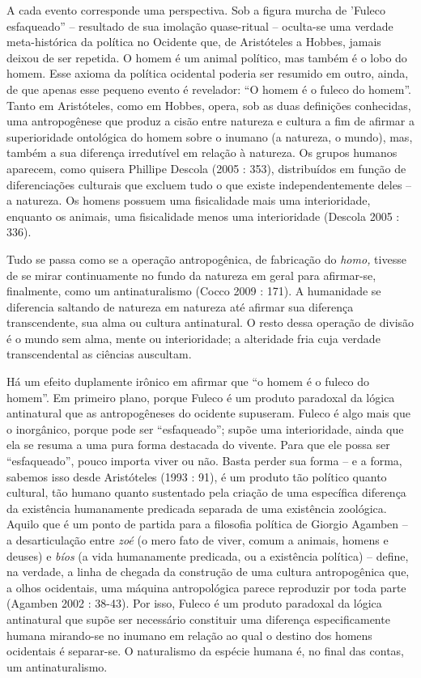 A cada evento corresponde uma perspectiva. Sob a figura murcha de
'Fuleco esfaqueado'' -- resultado de sua imolação quase-ritual --
oculta-se uma verdade meta-histórica da política no Ocidente que, de
Aristóteles a Hobbes, jamais deixou de ser repetida. O homem é um animal
político, mas também é o lobo do homem. Esse axioma da política
ocidental poderia ser resumido em outro, ainda, de que apenas esse
pequeno evento é revelador: ``O homem é o fuleco do homem''. Tanto em
Aristóteles, como em Hobbes, opera, sob as duas definições conhecidas,
uma antropogênese que produz a cisão entre natureza e cultura a fim de
afirmar a superioridade ontológica do homem sobre o inumano (a natureza,
o mundo), mas, também a sua diferença irredutível em relação à natureza.
Os grupos humanos aparecem, como quisera Phillipe Descola (2005 : 353),
distribuídos em função de diferenciações culturais que excluem tudo o
que existe independentemente deles -- a natureza. Os homens possuem uma
fisicalidade mais uma interioridade, enquanto os animais, uma
fisicalidade menos uma interioridade (Descola 2005 : 336).

Tudo se passa como se a operação antropogênica, de fabricação do
\emph{homo, }tivesse de se mirar continuamente no fundo da natureza em
geral para afirmar-se, finalmente, como um antinaturalismo (Cocco 2009 :
171). A humanidade se diferencia saltando de natureza em natureza até
afirmar sua diferença transcendente, sua alma ou cultura antinatural. O
resto dessa operação de divisão é o mundo sem alma, mente ou
interioridade; a alteridade fria cuja verdade transcendental as ciências
auscultam.

Há um efeito duplamente irônico em afirmar que ``o homem é o fuleco do
homem''. Em primeiro plano, porque Fuleco é um produto paradoxal da
lógica antinatural que as antropogêneses do ocidente supuseram. Fuleco é
algo mais que o inorgânico, porque pode ser ``esfaqueado''; supõe uma
interioridade, ainda que ela se resuma a uma pura forma destacada do
vivente. Para que ele possa ser ``esfaqueado'', pouco importa viver ou
não. Basta perder sua forma -- e a forma, sabemos isso desde Aristóteles
(1993 : 91), é um produto tão político quanto cultural, tão humano
quanto sustentado pela criação de uma específica diferença da existência
humanamente predicada separada de uma existência zoológica. Aquilo que é
um ponto de partida para a filosofia política de Giorgio Agamben -- a
desarticulação entre \emph{zoé }(o mero fato de viver, comum a animais,
homens e deuses) e \emph{bíos} (a vida humanamente predicada, ou a
existência política) -- define, na verdade, a linha de chegada da
construção de uma cultura antropogênica que, a olhos ocidentais, uma
máquina antropológica parece reproduzir por toda parte (Agamben 2002 :
38-43). Por isso, Fuleco é um produto paradoxal da lógica antinatural
que supõe ser necessário constituir uma diferença especificamente humana
mirando-se no inumano em relação ao qual o destino dos homens ocidentais
é separar-se. O naturalismo da espécie humana é, no final das contas, um
antinaturalismo.

